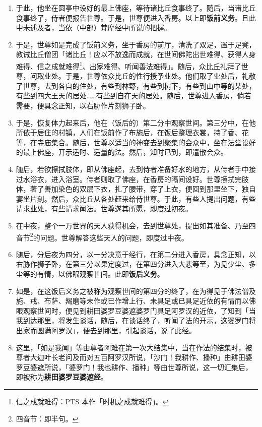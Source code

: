 \begin{enumerate}
\item 于此，他坐在圆亭中设好的最上佛座，等待诸比丘食事终了。随后，当诸比丘食事终了，侍者便报告世尊。于是，世尊便进入香房。以上即\textbf{饭前义务}。且此中未述及者，当依（中部）梵摩经中所说的把握。
\item 于是，世尊如是完成了饭前义务，坐于香房的前厅，清洗了双足，置于足凳，教诫比丘僧团「诸比丘！应以不放逸而成就，在世间佛陀出世难得、获得人身难得、信之成就难得\footnote{信之成就难得：PTS 本作「时机之成就难得」。}、出家难得、听闻善法难得」。随后，众比丘礼拜了世尊，问取业处。于是，世尊依众比丘的性行授予业处。他们取了业处后，礼敬了世尊，去到各自的住处，有些到林野，有些到树下，有些到山中等的某处，有些到四大王天的居处……有些到自在天的居处。随后，世尊进入香房，倘若需要，便具念正知，以右胁作片刻狮子卧。
\item 于是，恢复体力起来后，他在（饭后的）第二分中观察世间。第三分中，在他所依于居住的村镇，人们在饭前作了布施后，在饭后整理衣裳，持了香、花等，在寺庙集合。随后，世尊以适当的神变去到聚集的会众中，坐在法堂设好的最上佛座，开示适时、适量的法。然后，知时已到，即遣散会众。
\item 随后，若欲擦拭肢体，即从佛座起，去到侍者准备好水的地方，从侍者手中接过水浴衣，进入浴室。侍者则取了佛座，在香房的隔间设好。世尊擦拭完肢体，著了善加染色的双层下衣，扎了腰带，穿了上衣，便回到那里坐下，独自宴坐片刻。然后，众比丘从各处赶来给侍世尊。于此，有些人提出问题，有些请求业处，有些请求闻法。世尊遂其所愿，即度过初夜。
\item 在中夜，整个一万世界的天人获得机会，去到世尊处，提出如其准备、乃至四音节\footnote{四音节：即半句。}的问题。世尊解答这些天人的问题，即度过中夜。
\item 随后，分后夜为四分，以一分决意于经行，在第二分进入香房，具念正知，以右胁作狮子卧，在第三分以果定度过，在第四分进入大悲等至，为见少尘、多尘等的有情，以佛眼观察世间。此即\textbf{饭后义务}。
\item 如是，在这饭后义务之被称为观察世间的第四分的终了，在为得见于佛法僧及施、戒、布萨、羯磨等未作或已作增上行、未具足或已具足近依的有情而以佛眼观察世间时，便见到耕田婆罗豆婆遮婆罗门具足阿罗汉的近依，了知到「当我到达那里，将发生谈话，随后，在谈话终了，听闻了法的开示，这婆罗门将出家而圆满阿罗汉」，便去到那里，引起谈话，说了此经。
\item 这里，「如是我闻」等由尊者阿难在第一次大结集中，当在作法的结集时，被尊者大迦叶长老问及而对五百阿罗汉所说，「沙门！我耕作、播种」由耕田婆罗豆婆遮所说，「婆罗门！我也耕作、播种」等由世尊所说，这一切汇集后，即被称为\textbf{耕田婆罗豆婆遮经}。

\end{enumerate}
